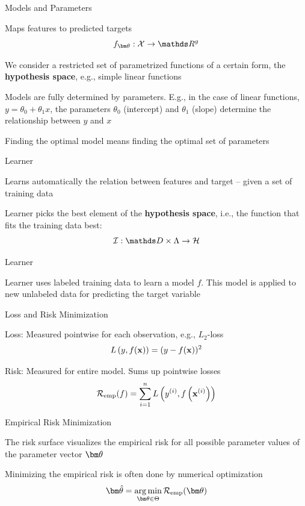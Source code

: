\documentclass[11pt,compress,t,notes=noshow, xcolor=table]{beamer}
\begin{document}
\begin{framei}[fs=small]{Models and Parameters}
\item Maps features to predicted targets
$$
f_{\thetav} : \Xspace \rightarrow \R^g
$$ 
\item  We consider a restricted set of parametrized functions of a certain form, the \textbf{hypothesis space}, e.g., simple linear functions
\item Models are fully determined by parameters. E.g., in the case of linear functions, $y = \theta_0 + \theta_1 x $, the parameters $\theta_0$ (intercept) and $\theta_1$ (slope) determine the relationship between $y$ and $x$
\item Finding the optimal model means finding the optimal set of parameters
\end{framei}


\begin{framei}{Learner}
\item Learns automatically the relation between features and target -- given a set of training data
\item Learner picks the best element of the \textbf{hypothesis space}, i.e., the function that fits the training data best:
$$
\ind: \preimageInducerShort \rightarrow \Hspace
$$
\vfill
{}
\end{framei}


\begin{framei}{Learner}
\item Learner uses labeled training data to learn a model $f$. This model is applied to new unlabeled data for predicting the target variable
\end{framei}


\begin{framei}{Loss and Risk Minimization}
\item Loss: Measured pointwise for each observation, e.g., $L_2$-loss
$$
L\left(y, f(\mathbf{x})\right) = (y - f(\mathbf{x}))^2
$$
\item Risk: Measured for entire model. Sums up pointwise losses
$$
\mathcal{R}_{\text{emp}}(f) = \sum\limits_{i=1}^n L\left(y^{(i)}, f\left(\mathbf{x}^{(i)}\right)\right)
$$
\vfill
{}
\end{framei}


\begin{framei}[fs=small]{Empirical Risk Minimization}
\item The risk surface visualizes the empirical risk for all possible parameter values of the parameter vector $\thetav$
\item Minimizing the empirical risk is often done by numerical optimization
$$
\thetavh = \argmin_{\thetav \in \Theta} \risket
$$
\end{framei}

\endlecture
\end{document}
